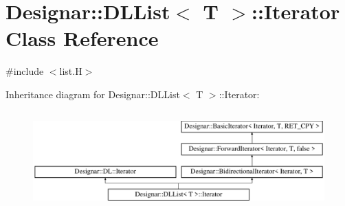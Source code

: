 \hypertarget{class_designar_1_1_d_l_list_1_1_iterator}{}\section{Designar\+:\+:D\+L\+List$<$ T $>$\+:\+:Iterator Class Reference}
\label{class_designar_1_1_d_l_list_1_1_iterator}


{\ttfamily \#include $<$list.\+H$>$}

Inheritance diagram for Designar\+:\+:D\+L\+List$<$ T $>$\+:\+:Iterator\+:\begin{figure}[H]
\begin{center}
\leavevmode
\includegraphics[height=3.822526cm]{class_designar_1_1_d_l_list_1_1_iterator}
\end{center}
\end{figure}
